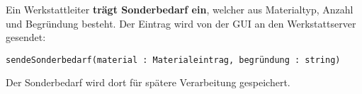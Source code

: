 Ein Werkstattleiter \textbf{trägt Sonderbedarf ein}, welcher aus Materialtyp, Anzahl und Begründung besteht. Der Eintrag wird von der GUI an den Werkstattserver gesendet:

\texttt{sendeSonderbedarf(material : Materialeintrag, begründung : string)}

Der Sonderbedarf wird dort für spätere Verarbeitung gespeichert.